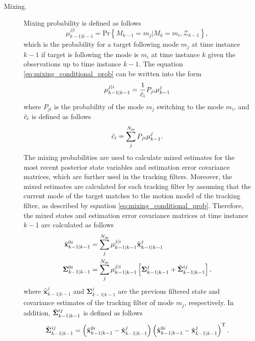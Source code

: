 \documentclass[english, 12pt, a4paper, elec, utf8, a-1b, online]{aaltothesis}
\numberwithin{equation}{section}
\renewcommand{\vec}[1]{\mathbf{#1}}
\renewcommand{\Pr}[1]{\text{Pr}\left\{ #1 \right\}}
\newcommand{\transpose}[1]{#1^\text{T}}
\newcommand{\lastmxprobs}{\mu^{j|i}_{k-1|k-1}}
\newcommand{\mxnorm}{ \Bar{c}_i }
\newcommand{\xmxinit}{\hat{\vec{x}}^{0i}_{k-1|k-1}}
\newcommand{\ecovmxinit}{\bm{\Sigma}^{0i}_{k-1|k-1}}
\newcommand{\modexlast}{\hat{\vec{x}}^{j}_{k-1|k-1}}
\newcommand{\modecovlast}{\bm{\Sigma}^j_{k-1|k-1}}
\newcommand{\modemxcovlast}{\Tilde{\bm{\Sigma}}^{ij}_{k-1|k-1}}
\newcommand{\nmodels}{{N_\text{m}}}
\begin{document}
\begin{description}
\item[Mixing.]

Mixing probability is defined as follows
\begin{equation}\label{eq:mixing_conditional_prob}
    \lastmxprobs = \Pr{M_{k-1}=m_j|M_{k}=m_i, \mathcal{Z}_{k-1}},
\end{equation}
which is the probability for a target following mode $m_j$ at time instance $k-1$ if target is following the mode is $m_i$ at time instance $k$ given the observations up to time instance $k-1$.
The equation \eqref{eq:mixing_conditional_prob} can be written into the form
\begin{equation}
    \lastmxprobs = \frac{1}{\mxnorm} P_{ji} \mu^j_{k-1} \label{eq:imm_mx_probs}
\end{equation}
where $P_{ji}$ is the probability of the mode $m_j$ switching to the mode $m_i$, and $\mxnorm$ is defined as follows
\begin{equation}
    \mxnorm = \sum_j^\nmodels P_{ji} \mu^j_{k-1}. \label{eq:imm_mx_normalization}
\end{equation}
The mixing probabilities are used to calculate mixed estimates for the most recent posterior state variables and estimation error covariance matrices, which are further used in the tracking filters.
Moreover, the mixed estimates are calculated for each tracking filter by assuming that the current mode of the target matches to the motion model of the tracking filter, as described by equation \eqref{eq:mixing_conditional_prob}.
Therefore, the mixed states and estimation error covariance matrices at time instance $k-1$ are calculated as follows
\begin{align}
    \xmxinit &= \sum_j^\nmodels \lastmxprobs \modexlast \label{eq:imm_mx_init_x}\\
    \ecovmxinit &= \sum_j^\nmodels \lastmxprobs \left[ \modecovlast + \modemxcovlast \right], \label{eq:imm_mx_init_P}
\end{align}
where $\modexlast$ and $\modecovlast$ are the previous filtered state and covariance estimates of the tracking filter of mode $m_j$, respectively. 
In addition, $\modemxcovlast$ is defined as follows
\begin{equation}
    \modemxcovlast = 
    \left( \xmxinit - \modexlast  \right) 
    \transpose{\left( \xmxinit - \modexlast   \right)}.\label{eq:imm_mx_init_Ptilde}
\end{equation}


\end{description}
\end{document}
